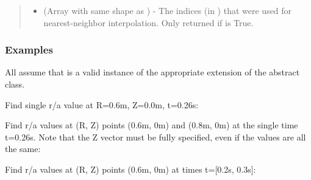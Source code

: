 \documentclass[letterpaper,10pt,english]{sphinxmanual}
\begin{document}
\begin{fulllineitems}
\begin{fulllineitems}
\begin{quote}
\begin{description}
\begin{itemize}
\item {} 
 (Array with same shape as ) - The indices
(in ) that were used for
nearest-neighbor interpolation. Only returned if  is
True.

\end{itemize}


\end{description}\end{quote}
\subsubsection*{Examples}

All assume that  is a valid instance of the appropriate
extension of the {\hyperref[\detokenize{eqtools:eqtools.core.Equilibrium}]{}} abstract class.

Find single r/a value at R=0.6m, Z=0.0m, t=0.26s:

\begin{sphinxVerbatim}[commandchars=\\\{\}]
    
\end{sphinxVerbatim}

Find r/a values at (R, Z) points (0.6m, 0m) and (0.8m, 0m) at the
single time t=0.26s. Note that the Z vector must be fully specified,
even if the values are all the same:

\begin{sphinxVerbatim}[commandchars=\\\{\}]
  \PYG{p}{[} \PYG{p}{]} \PYG{p}{[} \PYG{p}{]} 
\end{sphinxVerbatim}

Find r/a values at (R, Z) points (0.6m, 0m) at times t={[}0.2s, 0.3s{]}:

\begin{sphinxVerbatim}[commandchars=\\\{\}]
    \PYG{p}{[} \PYG{p}{]}
\end{sphinxVerbatim}


\end{fulllineitems}
\end{fulllineitems}
\end{document}
